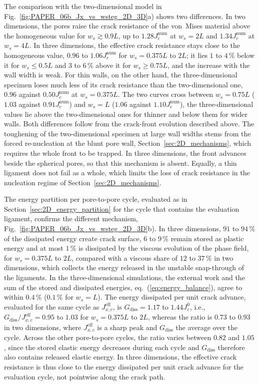 \documentclass[pdflatex,sn-mathphys-num]{sn-jnl}%
\theoremstyle{thmstyleone}%
\theoremstyle{thmstyletwo}%
\theoremstyle{thmstylethree}%
\begin{document}
The comparison with the two-dimensional model in Fig.~\ref{fig:PAPER_06b_Jx_vs_wsteg_2D_3D}a) shows two differences. In two dimensions, the pores raise the crack resistance of the von~Mises material above the homogeneous value for $w_s \gtrsim 0.9L$, up to $1.28J_c^{\text{num}}$ at $w_s = 2L$ and $1.34J_c^{\text{num}}$ at $w_s = 4L$. In three dimensions, the effective crack resistance stays close to the homogeneous value, $0.96$ to $1.06J_c^{\text{num}}$ for $w_s = 0.375L$ to $2L$; it lies $1$ to $4\,\%$ below it for $w_s \le 0.5L$ and $3$ to $6\,\%$ above it for $w_s \ge 0.75L$, and the increase with the wall width is weak. For thin walls, on the other hand, the three-dimensional specimen loses much less of its crack resistance than the two-dimensional one, $0.96$ against $0.50J_c^{\text{num}}$ at $w_s = 0.375L$. The two curves cross between $w_s = 0.75L$ ($1.03$ against $0.91J_c^{\text{num}}$) and $w_s = L$ ($1.06$ against $1.10J_c^{\text{num}}$), the three-dimensional values lie above the two-dimensional ones for thinner and below them for wider walls. Both differences follow from the crack-front evolution described above. The toughening of the two-dimensional specimen at large wall widths stems from the forced re-nucleation at the blunt pore wall, Section~\ref{sec:2D_mechanisms}, which requires the whole front to be trapped. In three dimensions, the front advances beside the spherical pores, so that this mechanism is absent. Equally, a thin ligament does not fail as a whole, which limits the loss of crack resistance in the nucleation regime of Section~\ref{sec:2D_mechanisms}.

The energy partition per pore-to-pore cycle, evaluated as in Section~\ref{sec:2D_energy_partition} for the cycle that contains the evaluation ligament, confirms the different mechanism, Fig.~\ref{fig:PAPER_06b_Jx_vs_wsteg_2D_3D}b). In three dimensions, $91$ to $94\,\%$ of the dissipated energy create crack surface, $6$ to $9\,\%$ remain stored as plastic energy and at most $1\,\%$ is dissipated by the viscous evolution of the phase field, for $w_s = 0.375L$ to $2L$, compared with a viscous share of $12$ to $37\,\%$ in two dimensions, which collects the energy released in the unstable snap-through of the ligaments. In the three-dimensional simulations, the external work and the sum of the stored and dissipated energies, eq.~(\ref{eq:energy_balance}), agree to within $0.4\,\%$ ($0.1\,\%$ for $w_s = L$). The energy dissipated per unit crack advance, evaluated for the same cycle as $J_{x,c}^{\text{eff}}$, is $G_{\text{diss}} = 1.17$ to $1.44J_c^0$, i.e., $G_{\text{diss}}/J_{x,c}^{\text{eff}} = 0.95$ to $1.03$ for $w_s = 0.375L$ to $2L$, whereas the ratio is $0.73$ to $0.93$ in two dimensions, where $J_{x,c}^{\text{eff}}$ is a sharp peak and $G_{\text{diss}}$ the average over the cycle. Across the other pore-to-pore cycles, the ratio varies between $0.82$ and $1.05$, since the stored elastic energy decreases during each cycle and $G_{\text{diss}}$ therefore also contains released elastic energy. In three dimensions, the effective crack resistance is thus close to the energy dissipated per unit crack advance for the evaluation cycle, not pointwise along the crack path.
\end{document}
